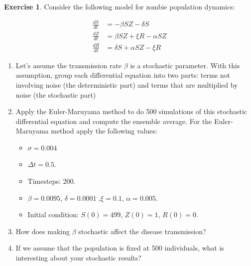 \documentclass[
]{book}
\theoremstyle{definition}
\theoremstyle{definition}
\theoremstyle{definition}
\newtheorem{exercise}{Exercise}[chapter]
\theoremstyle{remark}
\begin{document}
\begin{exercise}
\protect\hypertarget{exr:unnamed-chunk-346}{}{\label{exr:unnamed-chunk-346} }Consider the following model for zombie population dynamics:

\begin{equation}
\begin{split}  
\frac{dS}{dt} &=-\beta S Z - \delta S  \\
\frac{dZ}{dt} &= \beta S Z + \xi R - \alpha SZ \\
\frac{dR}{dt} &= \delta S+ \alpha SZ  - \xi R
\end{split}
\end{equation}

\begin{enumerate}[label=\alph*.]
\item Let's assume the transmission rate $\beta$ is a stochastic parameter.  With this assumption, group each differential equation into two parts: terms not involving noise (the deterministic part) and terms that are multiplied by noise (the stochastic part)



\item Apply the Euler-Maruyama method to do 500 simulations of this stochastic differential equation and compute the ensemble average.  For the Euler-Maruyama method apply the following values:

\begin{itemize}
\item $\sigma = 0.004$
\item $\Delta t= 0.5$.
\item Timesteps: 200.
\item $\beta = 0.0095$, $\delta = 0.0001$ ,$\xi =  0.1$, $\alpha = 0.005$.
\item Initial condition: $S(0)=499$, $Z(0)=1$, $R(0)=0$.
\end{itemize}

\item  How does making $\beta$ stochastic affect the disease transmission?  
\item If we assume that the population is fixed at 500 individuals, what is interesting about your stochastic results?

\end{enumerate}
\end{exercise}
\end{document}
